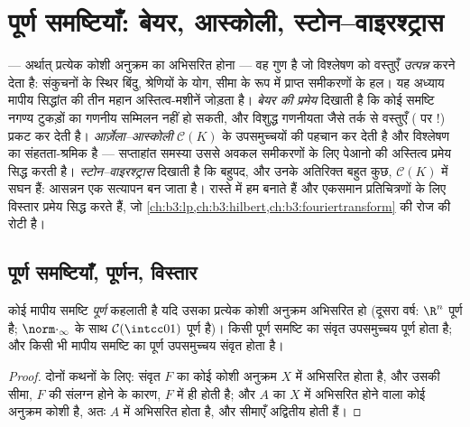 \chapter{पूर्ण समष्टियाँ: बेयर, आस्कोली, स्टोन--वाइरश्ट्रास}
\label{ch:b3:complete}

 --- अर्थात् प्रत्येक कोशी अनुक्रम का अभिसरित होना --- वह
गुण है जो विश्लेषण को वस्तुएँ \emph{उत्पन्न} करने देता है:
संकुचनों के स्थिर बिंदु, श्रेणियों के योग, सीमा के रूप में
प्राप्त समीकरणों के हल। यह अध्याय मापीय सिद्धांत की तीन महान
अस्तित्व-मशीनें जोड़ता है। \emph{बेयर की प्रमेय} दिखाती है कि कोई
 समष्टि नगण्य टुकड़ों का गणनीय सम्मिलन नहीं हो सकती, और
विशुद्ध गणनीयता जैसे तर्क से वस्तुएँ ( पर !) प्रकट कर देती है। \emph{आर्ज़ेला--आस्कोली} $\mathcal C(K)$ के 
उपसमुच्चयों की पहचान कर देती है और विश्लेषण का संहतता-श्रमिक है
--- सप्ताहांत समस्या उससे अवकल समीकरणों के लिए पेआनो की अस्तित्व
प्रमेय सिद्ध करती है। \emph{स्टोन--वाइरश्ट्रास} दिखाती है कि
बहुपद, और उनके अतिरिक्त बहुत कुछ, $\mathcal C(K)$ में सघन हैं: आसन्नन एक
 सत्यापन बन जाता है। रास्ते में हम  बनाते हैं और
एकसमान  प्रतिचित्रणों के लिए विस्तार प्रमेय सिद्ध करते हैं,
जो \cref{ch:b3:lp,ch:b3:hilbert,ch:b3:fouriertransform} की रोज की रोटी है।

\section{पूर्ण समष्टियाँ, पूर्णन, विस्तार}

\begin{definition}\label{def:b3:complete:complete}
कोई मापीय समष्टि \emph{पूर्ण} कहलाती है
यदि उसका प्रत्येक कोशी अनुक्रम अभिसरित हो (दूसरा वर्ष: $\R^n$ पूर्ण
है; $\norm\cdot_\infty$ के साथ $\mathcal C(\intcc01)$ पूर्ण है)। किसी पूर्ण समष्टि का संवृत
उपसमुच्चय पूर्ण होता है; और किसी भी मापीय समष्टि का पूर्ण
उपसमुच्चय संवृत होता है।
\end{definition}

\begin{proof}
दोनों कथनों के लिए: संवृत $F$ का कोई कोशी अनुक्रम $X$ में
अभिसरित होता है, और उसकी सीमा, $F$ की संलग्न होने के कारण, $F$
में ही होती है; और  $A$ का $X$ में अभिसरित होने वाला कोई
अनुक्रम कोशी है, अतः $A$ में अभिसरित होता है, और सीमाएँ अद्वितीय
होती हैं।
\end{proof}

